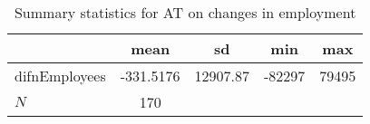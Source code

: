 \begin{table}[htbp]\centering
\def\sym#1{\ifmmode^{#1}\else\(^{#1}\)\fi}
\caption{Summary statistics for AT on changes in employment}
\begin{tabular}{l*{1}{cccc}}
\hline\hline
            &        mean&          sd&         min&         max\\
\hline
difnEmployees&   -331.5176&    12907.87&      -82297&       79495\\
\hline
\(N\)       &         170&            &            &            \\
\hline\hline
\end{tabular}
\end{table}
